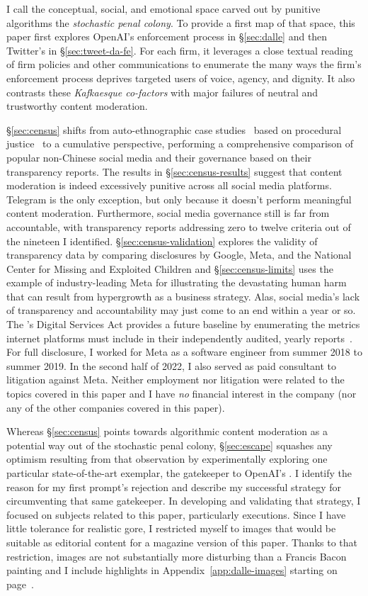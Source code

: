 I call the conceptual, social, and emotional space carved out by punitive
algorithms the \emph{stochastic penal colony}. To provide a first map of that
space, this paper first explores OpenAI's enforcement process in
\S\ref{sec:dalle} and then Twitter's in \S\ref{sec:tweet-da-fe}. For each firm,
it leverages a close textual reading of firm policies and other communications
to enumerate the many ways the firm's enforcement process deprives targeted
users of voice, agency, and dignity. It also contrasts these \emph{Kafkaesque
co-factors} with major failures of neutral and trustworthy content moderation.

\S\ref{sec:census} shifts from auto-ethnographic case studies~\cite{Ellis2003}
based on procedural justice~\cite{Tyler2003,Tyler2006,Tyler2007} to a cumulative
perspective, performing a comprehensive comparison of popular non-Chinese social
media and their governance based on their transparency reports. The results in
\S\ref{sec:census-results} suggest that content moderation is indeed excessively
punitive across all social media platforms. Telegram is the only exception, but
only because it doesn't perform meaningful content moderation. Furthermore,
social media governance still is far from accountable, with transparency reports
addressing zero to twelve criteria out of the nineteen I identified.
\S\ref{sec:census-validation} explores the validity of transparency data by
comparing disclosures by Google, Meta, and the National Center for Missing and
Exploited Children and \S\ref{sec:census-limits} uses the example of
industry-leading Meta for illustrating the devastating human harm that can
result from hypergrowth as a business strategy. Alas, social media's lack of
transparency and accountability may just come to an end within a year or so. The
's Digital Services Act provides a future baseline by enumerating the
metrics internet platforms must include in their independently audited, yearly
reports~\cite{EuropeanParliamentAndCouncil2022}. For full disclosure, I worked
for Meta as a software engineer from summer 2018 to summer 2019. In the second
half of 2022, I also served as paid consultant to litigation against Meta.
Neither employment nor litigation were related to the topics covered in this
paper and I have \emph{no} financial interest in the company (nor any of the
other companies covered in this paper).

Whereas \S\ref{sec:census} points towards algorithmic content moderation as a
potential way out of the stochastic penal colony, \S\ref{sec:escape} squashes
any optimism resulting from that observation by experimentally exploring one
particular state-of-the-art exemplar, the gatekeeper to OpenAI's \DALLE. I
identify the reason for my first prompt's rejection and describe my successful
strategy for circumventing that same gatekeeper. In developing and validating
that strategy, I focused on subjects related to this paper, particularly
executions. Since I have little tolerance for realistic gore, I restricted
myself to images that would be suitable as editorial content for a magazine
version of this paper. Thanks to that restriction, images are not substantially
more disturbing than a Francis Bacon painting and I include highlights in
Appendix~\ref{app:dalle-images} starting on page~\pageref{app:dalle-images}.

